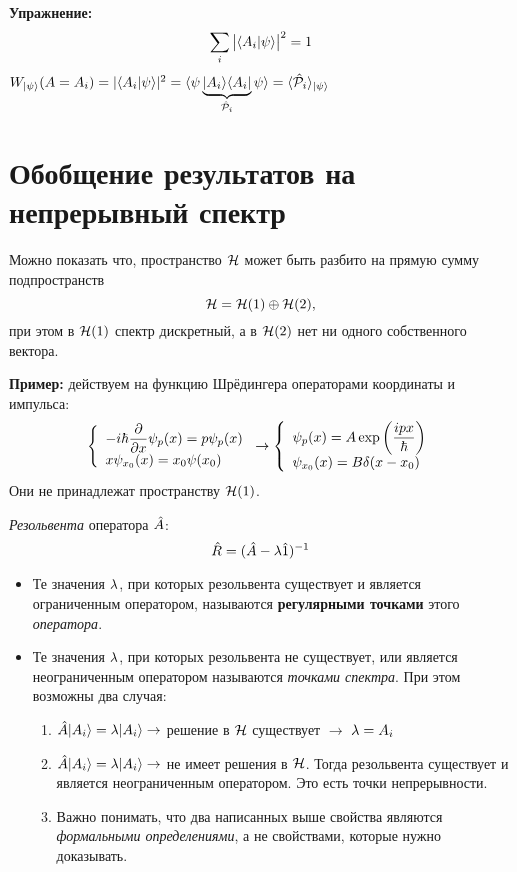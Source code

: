 \textbf{Упражнение:}
$$
    \sum_i \big| \langle A_i | \psi \rangle\big|^2 = 1
$$
\Rem $W_{| \psi \rangle} (A = A_i) = |\langle A_i | \psi \rangle|^2 = \langle \psi \underbrace{| A_i \rangle \langle A_i |}_{\Hat {\mathcal P}_i} \psi \rangle = \langle \Hat {\mathcal P}_i \rangle_{| \psi \rangle}$

\section{\small Обобщение результатов на непрерывный спектр \advanced}
Можно показать что, пространство $\mathcal H$ может быть разбито на прямую сумму подпространств
$$
    \mathcal H = \mathcal H(1) \oplus \mathcal H(2),
$$
при этом в $\mathcal H(1)$ спектр дискретный, а в $\mathcal H(2)$ нет ни одного собственного вектора.

\textbf{Пример:}
действуем на функцию Шрёдингера операторами координаты и импульса:
$$
\left\{
\begin{array}{l}
      -i \hbar \dfrac{\partial }{\partial x} \psi_p (x) = p \psi_p (x) \\
        x \psi_{x_0} (x) = x_0 \psi(x_0)
\end{array}
\right.
\to
\left\{
\begin{array}{l}
  \psi_p (x)= A \exp\left(\dfrac{ipx}{\hbar}\right) \\
  \psi_{x_0} (x) = B \delta(x - x_0)
\end{array}
\right.
$$
Они не принадлежат пространству $\mathcal H(1)$.

\Def \emph{Резольвента} оператора $\Hat A$:
$$
    \Hat R = (\Hat A - \lambda \Hat 1)^{-1}
$$
\Def
\begin{itemize}
  \item Те значения $\lambda$, при которых резольвента существует и является ограниченным оператором, называются \textbf{регулярными точками} этого \emph{оператора}.
  \item Те значения $\lambda$, при которых резольвента не существует, или является неограниченным оператором называются \emph{точками спектра}. При этом возможны два случая:
      \begin{enumerate}
        \item $\Hat A | A_i \rangle = \lambda | A_i \rangle \to $ решение в $\mathcal H$ существует $\to$ $\lambda = A_i$
        \item $\Hat A | A_i \rangle = \lambda | A_i \rangle \to $ не имеет решения в $\mathcal H$. Тогда резольвента существует и является неограниченным оператором. Это есть точки непрерывности.
  \item Важно понимать, что два написанных выше свойства являются \emph{формальными определениями}, а не свойствами, которые нужно доказывать.
      \end{enumerate}
\end{itemize}
